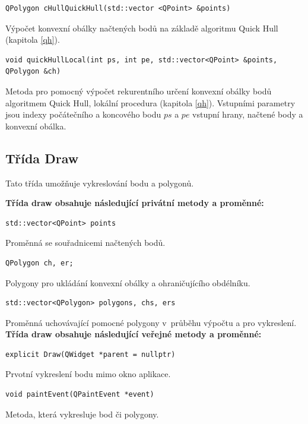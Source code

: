 \documentclass[a4paper, 12pt, oneside, titlepage]{article} %
\begin{document}
\begin{verbatim}
QPolygon cHullQuickHull(std::vector <QPoint> &points)
\end{verbatim}
Výpočet konvexní obálky načtených bodů na základě algoritmu Quick Hull (kapitola \ref{qh}).\\

\begin{verbatim}
void quickHullLocal(int ps, int pe, std::vector<QPoint> &points, QPolygon &ch)
\end{verbatim}
Metoda pro pomocný výpočet rekurentního určení konvexní obálky bodů algoritmem Quick Hull, lokální procedura (kapitola \ref{qh}). Vstupními parametry jsou indexy počátečního a koncového bodu $ps$ a $pe$ vstupní hrany, načtené body a konvexní obálka.\\

    
    
\subsection{Třída Draw}
Tato třída umožňuje vykreslování bodu a polygonů.

\textbf{Třída draw obsahuje následující privátní metody a proměnné:}
\begin{verbatim}
std::vector<QPoint> points
\end{verbatim}
Proměnná se souřadnicemi načtených bodů.\\

\begin{verbatim}
QPolygon ch, er;
\end{verbatim}
Polygony pro ukládání konvexní obálky a ohraničujícího obdélníku.\\

\begin{verbatim}
std::vector<QPolygon> polygons, chs, ers
\end{verbatim}
Proměnná uchovávající pomocné polygony v~průběhu výpočtu a pro vykreslení.\\


\textbf{Třída draw obsahuje následující veřejné metody a proměnné:}
\begin{verbatim}
explicit Draw(QWidget *parent = nullptr)
\end{verbatim}
Prvotní vykreslení bodu mimo okno aplikace.\\

\begin{verbatim}
void paintEvent(QPaintEvent *event)
\end{verbatim}
Metoda, která vykresluje bod či polygony.\\
\end{document}
